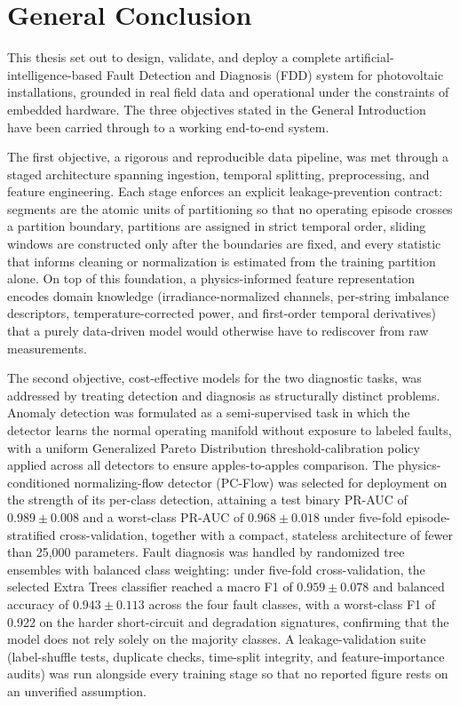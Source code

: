 \chapter*{General Conclusion}
\label{ch:conclusion}

This thesis set out to design, validate, and deploy a complete artificial-intelligence-based Fault Detection and Diagnosis (FDD) system for photovoltaic installations, grounded in real field data and operational under the constraints of embedded hardware. The three objectives stated in the General Introduction have been carried through to a working end-to-end system.

The first objective, a rigorous and reproducible data pipeline, was met through a staged architecture spanning ingestion, temporal splitting, preprocessing, and feature engineering. Each stage enforces an explicit leakage-prevention contract: segments are the atomic units of partitioning so that no operating episode crosses a partition boundary, partitions are assigned in strict temporal order, sliding windows are constructed only after the boundaries are fixed, and every statistic that informs cleaning or normalization is estimated from the training partition alone. On top of this foundation, a physics-informed feature representation encodes domain knowledge (irradiance-normalized channels, per-string imbalance descriptors, temperature-corrected power, and first-order temporal derivatives) that a purely data-driven model would otherwise have to rediscover from raw measurements.

The second objective, cost-effective models for the two diagnostic tasks, was addressed by treating detection and diagnosis as structurally distinct problems. Anomaly detection was formulated as a semi-supervised task in which the detector learns the normal operating manifold without exposure to labeled faults, with a uniform Generalized Pareto Distribution threshold-calibration policy applied across all detectors to ensure apples-to-apples comparison. The physics-conditioned normalizing-flow detector (PC-Flow) was selected for deployment on the strength of its per-class detection, attaining a test binary PR-AUC of $0.989 \pm 0.008$ and a worst-class PR-AUC of $0.968 \pm 0.018$ under five-fold episode-stratified cross-validation, together with a compact, stateless architecture of fewer than 25,000 parameters. Fault diagnosis was handled by randomized tree ensembles with balanced class weighting: under five-fold cross-validation, the selected Extra Trees classifier reached a macro F1 of $0.959 \pm 0.078$ and balanced accuracy of $0.943 \pm 0.113$ across the four fault classes, with a worst-class F1 of 0.922 on the harder short-circuit and degradation signatures, confirming that the model does not rely solely on the majority classes. A leakage-validation suite (label-shuffle tests, duplicate checks, time-split integrity, and feature-importance audits) was run alongside every training stage so that no reported figure rests on an unverified assumption.

